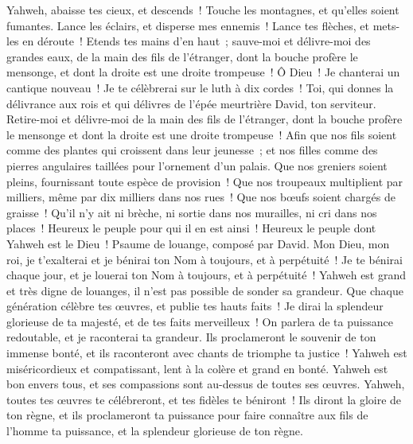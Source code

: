\begin{multicols}{2}
Yahweh, abaisse tes cieux, et descends~! Touche les montagnes, et qu'elles soient fumantes.
Lance les éclairs, et disperse mes ennemis~! Lance tes flèches, et mets-les en déroute~!
Etends tes mains d'en haut~; sauve-moi et délivre-moi des grandes eaux, de la main des fils de l'étranger,
dont la bouche profère le mensonge, et dont la droite est une droite trompeuse~!
Ô Dieu~! Je chanterai un cantique nouveau~! Je te célèbrerai sur le luth à dix cordes~!
Toi, qui donnes la délivrance aux rois et qui délivres de l'épée meurtrière David, ton serviteur.
Retire-moi et délivre-moi de la main des fils de l'étranger, dont la bouche profère le mensonge et dont la droite est une droite trompeuse~!
Afin que nos fils soient comme des plantes qui croissent dans leur jeunesse~; et nos filles comme des pierres angulaires taillées pour l'ornement d'un palais.
Que nos greniers soient pleins, fournissant toute espèce de provision~! Que nos troupeaux multiplient par milliers, même par dix milliers dans nos rues~!
Que nos bœufs soient chargés de graisse~! Qu'il n'y ait ni brèche, ni sortie dans nos murailles, ni cri dans nos places~!
Heureux le peuple pour qui il en est ainsi~! Heureux le peuple dont Yahweh est le Dieu~!
\VerseOne{}Psaume de louange, composé par David.  Mon Dieu, mon roi, je t'exalterai et je bénirai ton Nom à toujours, et à perpétuité~!
 Je te bénirai chaque jour, et je louerai ton Nom à toujours, et à perpétuité~!
 Yahweh est grand et très digne de louanges, il n'est pas possible de sonder sa grandeur.
 Que chaque génération célèbre tes œuvres, et publie tes hauts faits~!
 Je dirai la splendeur glorieuse de ta majesté, et de tes faits merveilleux~!
 On parlera de ta puissance redoutable, et je raconterai ta grandeur.
 Ils proclameront le souvenir de ton immense bonté, et ils raconteront avec chants de triomphe ta justice~!
 Yahweh est miséricordieux et compatissant, lent à la colère et grand en bonté.
 Yahweh est bon envers tous, et ses compassions sont au-dessus de toutes ses œuvres.
 Yahweh, toutes tes œuvres te célébreront, et tes fidèles te béniront~!
 Ils diront la gloire de ton règne, et ils proclameront ta puissance
 pour faire connaître aux fils de l'homme ta puissance, et la splendeur glorieuse de ton règne.

\end{multicols}
